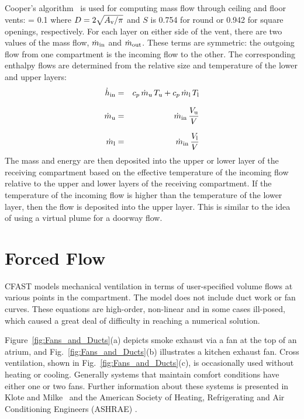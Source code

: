 Cooper's algorithm~\cite{Cooper:1989, Cooper:1990, Cooper:1995} is used for computing mass flow through ceiling and floor vents:
\be 
   \dm = 0.1   
\ee
where $D = 2 \sqrt{A_{\rm v} / \pi}$ and $S$ is 0.754 for round or 0.942 for square openings, respectively. For each layer on either side of the vent, there are two values of the mass flow, $\dot{m}_{\rm in}$ and $\dot{m}_{\rm out}$. These terms are symmetric: the outgoing flow from one compartment is the incoming flow to the other. The corresponding enthalpy flows are determined from the relative size and temperature of the lower and upper layers:
\begin{eqnarray} 
  \dot{h}_{\rm in} &=& c_p \, \dot{m}_{\rm u} \, T_{\rm u} + c_p \, \dot{m}_{\rm l} \, T_{\rm l} \\[0.1in]
  \dot{m}_{\rm u} &=& \dot{m}_{\rm in} \, \frac{V_{\rm u}}{V} \\[0.1in]
  \dot{m}_{\rm l} &=& \dot{m}_{\rm in} \, \frac{V_{\rm l}}{V} 
\end{eqnarray}
The mass and energy are then deposited into the upper or lower layer of the receiving compartment based on the effective temperature of the incoming flow relative to the upper and lower layers of the receiving compartment. If the temperature of the incoming flow is higher than the temperature of the lower layer, then the flow is deposited into the upper layer. This is similar to the idea of using a virtual plume for a doorway flow. 


\section{Forced Flow}

CFAST models mechanical ventilation in terms of user-specified volume flows at various points in the compartment. The model does not include duct work or fan curves. These equations are high-order, non-linear and in some cases ill-posed, which caused a great deal of difficulty in reaching a numerical solution.

Figure~\ref{fig:Fans_and_Ducts}(a) depicts smoke exhaust via a fan at the top of an atrium, and Fig.~\ref{fig:Fans_and_Ducts}(b) illustrates a kitchen exhaust fan.  Cross ventilation, shown in Fig.~\ref{fig:Fans_and_Ducts}(c), is occasionally used without heating or cooling.  Generally systems that maintain comfort conditions have either one or two fans. Further information about these systems is presented in Klote and Milke~\cite{Klote:2002} and the American Society of Heating, Refrigerating and Air Conditioning Engineers (ASHRAE) \cite{ASHRAE:2001}.


